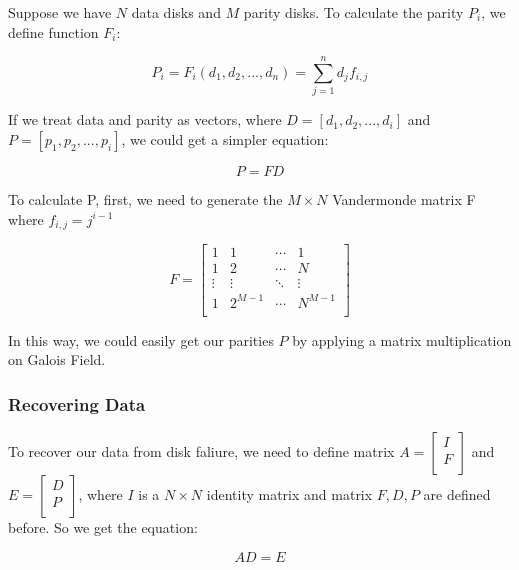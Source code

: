\documentclass[journal]{IEEEtran}
\begin{document}
Suppose we have $N$ data disks and $M$ parity disks. To calculate the parity $P_i$, we define function $F_i$: 

\begin{equation}
P_i = F_i(d_1,d_2,...,d_n) = \sum_{j=1}^{n}d_j f_{i,j}
\end{equation}

If we treat data and parity as vectors, where $D = [d_1, d_2, ... , d_i]$ and $P = [p_1, p_2, ... ,p_i]$, we could get a simpler equation:

\begin{equation}
P=FD
\end{equation}

To calculate P, first, we need to generate the $M \times N$ Vandermonde matrix F where $f_{i,j} = j ^ {i-1}$

\begin{equation}
F =
\left[
\begin{matrix}
1      & 1      & \cdots & 1      \\
1      & 2      & \cdots & N      \\
\vdots & \vdots & \ddots & \vdots \\
1      & 2^{M-1}      & \cdots & N^{M-1}      \\
\end{matrix}
\right]
\end{equation}

In this way, we could easily get our parities $P$ by applying a matrix multiplication on Galois Field.

\subsubsection{Recovering Data}

To recover our data from disk faliure, we need to define matrix $A = \left[\begin{matrix}I \\F \\\end{matrix}\right]$ and $E= \left[\begin{matrix}D \\P \\\end{matrix}\right]$, where $I$ is a $N \times N$ identity matrix and matrix $F, D, P$ are defined before. So we get the equation:

\begin{equation}
AD=E
\end{equation}
\end{document}
